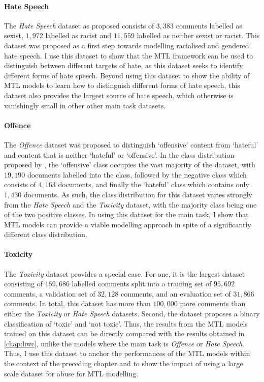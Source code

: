 \paragraph{Hate Speech}
The \textit{Hate Speech} dataset \citep{Waseem-Hovy:2016} as proposed consists of $3,383$ comments labelled as sexist, $1,972$ labelled as racist and $11,559$ labelled as neither sexist or racist.
This dataset was proposed as a first step towards modelling racialised and gendered hate speech.
I use this dataset to show that the MTL framework can be used to distinguish between different targets of hate, as this dataset seeks to identify different forms of hate speech.
Beyond using this dataset to show the ability of MTL models to learn how to distinguish different forms of hate speech, this dataset also provides the largest source of hate speech, which otherwise is vanishingly small in other other main task datasets.

\paragraph{Offence}
The \textit{Offence} dataset \citep{Davidson:2017} was proposed to distinguish `offensive' content from `hateful' and content that is neither `hateful' or `offensive'.
In the class distribution proposed by \citet{Davidson:2017}, the `offensive' class occupies the vast majority of the dataset, with $19,190$ documents labelled into the class, followed by the negative class which consists of $4,163$ documents, and finally the `hateful' class which contains only $1,430$ documents.
As such, the class distribution for this dataset varies strongly from the \textit{Hate Speech} and the \textit{Toxicity} dataset, with the majority class being one of the two positive classes.
In using this dataset for the main task, I show that MTL models can provide a viable modelling approach in spite of a significantly different class distribution.

\paragraph{Toxicity}
The \textit{Toxicity} dataset \citep{Wulczyn:2017} provides a special case.
For one, it is the largest dataset consisting of $159,686$ labelled comments split into a training set of $95,692$ comments, a validation set of $32,128$ comments, and an evaluation set of $31,866$ comments.
In total, this dataset has more than $100,000$ more comments than either the \textit{Toxicity} or \textit{Hate Speech} datasets.
Second, the dataset proposes a binary classification of `toxic' and `not toxic'.
Thus, the results from the MTL models trained on this dataset can be directly compared with the results obtained in \cref{chap:liwc}, unlike the models where the main task is \textit{Offence} or \textit{Hate Speech}.
Thus, I use this dataset to anchor the performances of the MTL models within the context of the preceding chapter and to show the impact of using a large scale dataset for abuse for MTL modelling.

